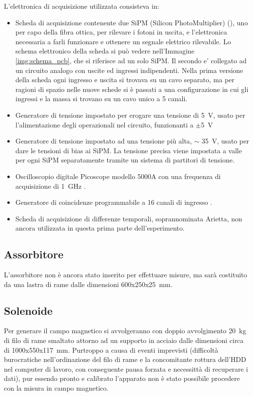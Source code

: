 L'elettronica di acquisizione utilizzata consisteva in:
\begin{itemize}
\item Scheda di acquisizione contenente due SiPM (Silicon PhotoMultiplier) (\cite{bib:SiPM}), uno per capo della fibra ottica, per rilevare i fotoni in uscita, e l'elettronica necessaria a farli funzionare e ottenere un segnale elettrico rilevabile. Lo schema elettronico della scheda si pu\`o vedere nell'Immagine \ref{img:schema_pcb}, che si riferisce ad un solo SiPM. Il secondo e' collegato ad un circuito analogo con uscite ed ingressi indipendenti. Nella prima versione della scheda ogni ingresso e uscita si trovava su un cavo separato, ma per ragioni di spazio nelle nuove schede si \`e passati a una configurazione in cui gli ingressi e la massa si trovano su un cavo unico a 5 canali.


\item Generatore di tensione impostato per erogare una tensione di 5~V, usato per l'alimentazione degli operazionali nel circuito, funzionanti a $\pm$5~V

\item Generatore di tensione impostato ad una tensione pi\`u alta, $\sim$ 35~V, usato per dare le tensioni di bias ai SiPM. La tensione precisa viene impostata a valle per ogni SiPM separatamente tramite un sistema di partitori di tensione.

\item Oscilloscopio digitale Picoscope modello 5000A con una frequenza di acquisizione di 1~GHz \cite{bib:datasheet_pico}.

\item Generatore di coincidenze programmabile a 16 canali di ingresso \cite{bib:articolo_garfa}.

\item Scheda di acquisizione di differenze temporali, soprannominata Arietta, non ancora utilizzata in questa prima parte dell'esperimento.

\end{itemize}

\subsection{Assorbitore}
L'assorbitore non è ancora stato inserito per effettuare misure, ma sarà costituito da una lastra di rame dalle dimensioni 600x250x25~mm.

\subsection{Solenoide}
Per generare il campo magnetico si avvolgeranno con doppio avvolgimento 20~kg di filo di rame smaltato attorno ad un supporto in acciaio dalle dimensioni circa
di 1000x550x117~mm.
Purtroppo a causa  di eventi imprevisti (difficolt\`a burocratiche nell'ordinazione del filo di rame e la concomitante rottura dell'HDD nel computer di lavoro, con conseguente pausa forzata e necessitt\`a di recuperare i dati), pur essendo pronto e calibrato l'apparato non \`e stato possibile procedere con la misura in campo magnetico.

